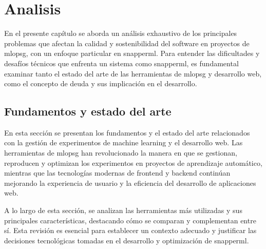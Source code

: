 \chapter{Analisis}
En el presente capítulo se aborda un análisis exhaustivo de los principales problemas que afectan la calidad y sostenibilidad del software en proyectos de \Gls{mlopsg}, con un enfoque particular en \Gls{snapperml}. Para entender las dificultades y desafíos técnicos que enfrenta un sistema como \Gls{snapperml}, es fundamental examinar tanto el estado del arte de las herramientas de \Gls{mlopsg} y desarrollo web, como el concepto de \gls{deuda} y sus implicación en el desarrollo.

\section{Fundamentos y estado del arte}
En esta sección se presentan los fundamentos y el estado del arte relacionados con la gestión de experimentos de machine learning y el desarrollo web. Las herramientas de \Gls{mlopsg} han revolucionado la manera en que se gestionan, reproducen y optimizan los experimentos en proyectos de aprendizaje automático, mientras que las tecnologías modernas de frontend y backend continúan mejorando la experiencia de usuario y la eficiencia del desarrollo de aplicaciones web.

A lo largo de esta sección, se analizan las herramientas más utilizadas y sus principales características, destacando cómo se comparan y complementan entre sí. Esta revisión es esencial para establecer un contexto adecuado y justificar las decisiones tecnológicas tomadas en el desarrollo y optimización de \Gls{snapperml}.

